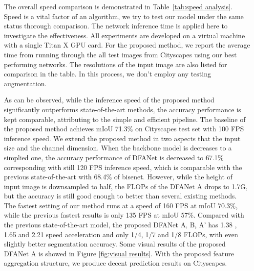 \documentclass[10pt,twocolumn,letterpaper]{article}
\begin{document}
The overall speed comparison is demonstrated in Table~\ref{tab:speed analysis}. Speed is a vital factor of an algorithm, we try to test our model under the same status thorough comparison. The network inference time is applied here to investigate the effectiveness. All experiments are developed on a virtual machine with a single Titan X GPU card. For the proposed method, we report the average time from running through the all test images from Cityscapes using our best performing networks. The resolutions of the input image are also listed for comparison in the table. In this process, we don't employ any testing augmentation.

As can be observed, while the inference speed of the proposed method significantly outperforms state-of-the-art methods, the accuracy performance is kept comparable, attributing to the simple and efficient pipeline. The baseline of the proposed method achieves mIoU 71.3\% on Cityscapes test set with 100 FPS inference speed. We extend the proposed method in two aspects that the input size and the channel dimension. When the backbone model is decreases to a simplied one, the accuracy performance of DFANet is decreased to 67.1\% corresponding with still 120 FPS inference speed, which is comparable with the previous state-of-the-art with 68.4\% of bisenet\cite{BiSeNet}. However, while the height of input image is downsampled to half, the FLOPs of the DFANet A drops to 1.7G, but the accuracy is still good enough to better than several existing methods. The fastest setting of our method runs at a speed of 160 FPS at mIoU 70.3\%, while the previous fastest results\cite{enet} is only 135 FPS at mIoU 57\%. Compared with the previous state-of-the-art model\cite{BiSeNet}, the proposed DFANet A, B, A' has 1.38 , 1.65  and 2.21  speed acceleration and only 1/4, 1/7 and 1/8 FLOPs, with even slightly better segmentation accuracy. Some visual results of the proposed DFANet A is showed in Figure \ref{fig:visual results}. With the proposed feature aggregation structure, we produce decent prediction results on Cityscapes. 
\end{document}
